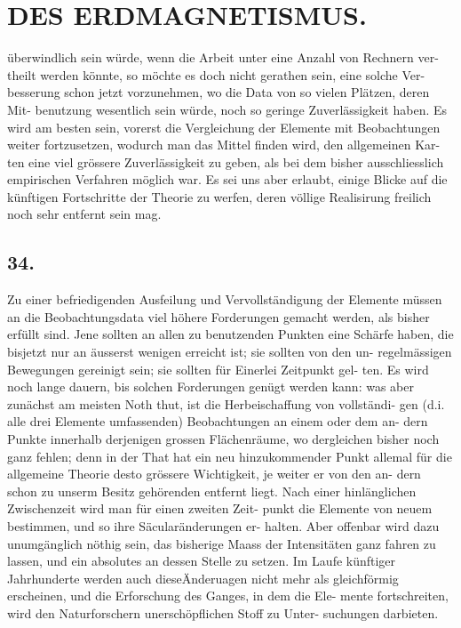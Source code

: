 \documentclass[12pt,a4paper]{article}
\begin{document}
\section*{DES ERDMAGNETISMUS.}
überwindlich sein würde, wenn die Arbeit unter eine Anzahl von Rechnern ver- theilt werden könnte, so möchte es doch nicht gerathen sein, eine solche Ver- besserung schon jetzt vorzunehmen, wo die Data von so vielen Plätzen, deren Mit- benutzung wesentlich sein würde, noch so geringe Zuverlässigkeit haben. Es wird am besten sein, vorerst die Vergleichung der Elemente mit Beobachtungen weiter fortzusetzen, wodurch man das Mittel finden wird, den allgemeinen Kar- ten eine viel grössere Zuverlässigkeit zu geben, als bei dem bisher ausschliesslich empirischen Verfahren möglich war. Es sei uns aber erlaubt, einige Blicke auf die künftigen Fortschritte der Theorie zu werfen, deren völlige Realisirung freilich noch sehr entfernt sein mag.

\subsection*{34.}
Zu einer befriedigenden Ausfeilung und Vervollständigung der Elemente müssen an die Beobachtungsdata viel höhere Forderungen gemacht werden, als bisher erfüllt sind. Jene sollten an allen zu benutzenden Punkten eine Schärfe haben, die bisjetzt nur an äusserst wenigen erreicht ist; sie sollten von den un- regelmässigen Bewegungen gereinigt sein; sie sollten für Einerlei Zeitpunkt gel- ten. Es wird noch lange dauern, bis solchen Forderungen genügt werden kann: was aber zunächst am meisten Noth thut, ist die Herbeischaffung von vollständi- gen (d.i. alle drei Elemente umfassenden) Beobachtungen an einem oder dem an- dern Punkte innerhalb derjenigen grossen Flächenräume, wo dergleichen bisher noch ganz fehlen; denn in der That hat ein neu hinzukommender Punkt allemal für die allgemeine Theorie desto grössere Wichtigkeit, je weiter er von den an- dern schon zu unserm Besitz gehörenden entfernt liegt. Nach einer hinlänglichen Zwischenzeit wird man für einen zweiten Zeit- punkt die Elemente von neuem bestimmen, und so ihre Säcularänderungen er- halten. Aber offenbar wird dazu unumgänglich nöthig sein, das bisherige Maass der Intensitäten ganz fahren zu lassen, und ein absolutes an dessen Stelle zu setzen. Im Laufe künftiger Jahrhunderte werden auch dieseÄnderuagen nicht mehr als gleichförmig erscheinen, und die Erforschung des Ganges, in dem die Ele- mente fortschreiten, wird den Naturforschern unerschöpflichen Stoff zu Unter- suchungen darbieten.
\end{document}
